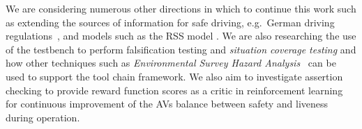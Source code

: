 We are considering numerous other directions in which to continue this work such as extending the sources of information for safe driving, e.g.\ German driving regulations~\cite{acountability}, and models such as the RSS model \cite{RSS_Shalev_Shwartz2017,RSS2_Koopman2019}. We are also researching the use of the testbench to perform falsification testing \cite{corso2020survey, akazaki2017causality} and \emph{situation coverage testing} \cite{alexander2015} and how other techniques such as \emph{Environmental Survey Hazard Analysis}~\cite{harper2021towards} can be used to support the tool chain framework. We also aim to investigate assertion checking to provide reward function scores as a critic in reinforcement learning for continuous improvement of the AVs balance between safety and liveness during operation.



    
    
